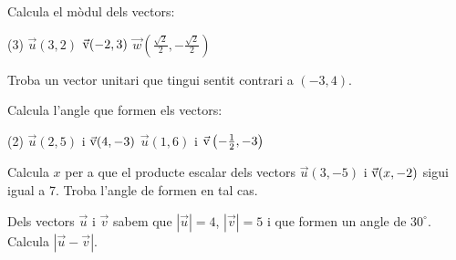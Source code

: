 \vspace{0.5 cm}

\begin{mylist}
	\exer Calcula el mòdul dels vectors:
	\begin{tasks}(3)
		\task $\vec u (3, 2)$  
		\task $\vec{\mathrm{v}} (-2, 3)$
		\task $\vec w \left( \frac{\sqrt{2}}{2}, -\frac{\sqrt{2}}{2} \right)$
	\end{tasks}

	\answers{[$|\vec u|=\sqrt{13}$, $|\vec v|=\sqrt{13}$, $|\vec w|=1$ és unitari]}
	
	\exer Troba un vector unitari que tingui sentit contrari a $(-3, 4)$.
	
	
	\exer[1] Calcula l'angle que formen els vectors:
	\begin{tasks}(2)
		\task $\vec u (2, 5)$ i $\vec{\mathrm{v}} (4, -3)$
		\task $\vec u (1, 6)$ i $\vec{\mathrm{v}} \left(-\frac{1}{2}, -3\right)$
	\end{tasks}
	
	\exer[1] Calcula $x$ per a que el producte escalar dels vectors $\vec u(3, -5)$ i $\vec{\mathrm{v}}(x,-2)$ sigui igual a 7. Troba l'angle de formen en tal cas.
	
	\exer Dels vectors $\vec{u}$ i $\vec{v}$ sabem que $|\vec u|=4$, $|\vec v|=5$ i que formen un angle de $30^\circ$. Calcula $|\vec u - \vec v|$.
	
	
\end{mylist}






